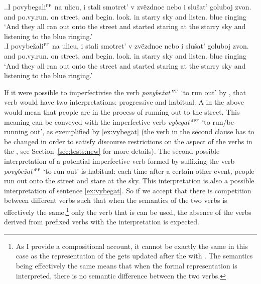 \ex.\label{ex:povy}\ag.\label{ex:povybegat}I povybegali$^{\textsc{pf}}$ na ulicu, i stali smotret' v zv\"{e}zdnoe nebo i slu\v{s}at' goluboj zvon.\\
and po.vy.run. on street, and begin. look. in starry sky and listen. blue ringing\\
\trans `And they all ran out onto the street and started staring at the starry sky and listening to the blue ringing.'\\
\bg.\label{ex:povybezhat}I povybe\v{z}ali$^{\textsc{pf}}$ na ulicu, i stali smotret' v zv\"{e}zdnoe nebo i slu\v{s}at' goluboj zvon.\\
and po.vy.run. on street, and begin. look. in starry sky and listen. blue ringing\\
\trans `And they all ran out onto the street and started staring at the starry sky and listening to the blue ringing.'

If it were possible to imperfectivise the verb \textit{povybe\v{z}at'}$^{\textsc{pf}}$ `to run out'  by , that  verb would have two interpretations: progressive and habitual. A  in the above  would mean that people are in the process of running out to the street. This meaning can be conveyed with the imperfective verb \textit{vybegat'}$^{\textsc{ipf}}$ `to run/be running out', as exemplified by \ref{ex:vybegat} (the verb in the second clause has to be changed in order to satisfy discourse restrictions on the aspect of the verbs in the , see Section~\ref{sec:tests:new} for more details). The second possible interpretation of a potential imperfective verb formed by suffixing the verb \textit{povybe\v{z}at'}$^{\textsc{pf}}$ `to run out' is habitual: each time after a certain other event, people run out onto the street and stare at the sky. This interpretation is also a possible interpretation of sentence \ref{ex:vybegat}. So if we accept that there is competition between different verbs such that when the semantics of the two verbs is effectively the same,\footnote{As I provide a compositional account, it cannot be exactly the same in this case as the representation of the  gets updated after the  with . The semantics being effectively the same means that when the formal representation is interpreted, there is no semantic difference between the two verbs.} only the verb that is  can be used, the absence of the  verbs derived from prefixed verbs with the  interpretation is expected.

